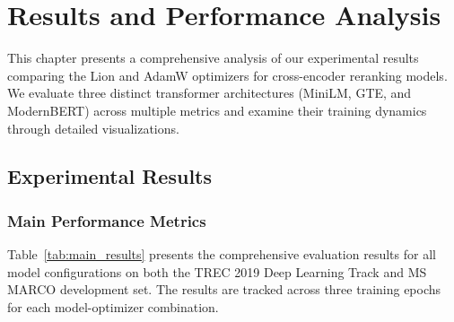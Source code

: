 \chapter{Results and Performance Analysis}
\label{Chapter5}

This chapter presents a comprehensive analysis of our experimental results comparing the Lion and AdamW optimizers for cross-encoder reranking models. We evaluate three distinct transformer architectures (MiniLM, GTE, and ModernBERT) across multiple metrics and examine their training dynamics through detailed visualizations.

\section{Experimental Results}

\subsection{Main Performance Metrics}

Table~\ref{tab:main_results} presents the comprehensive evaluation results for all model configurations on both the TREC 2019 Deep Learning Track and MS MARCO development set. The results are tracked across three training epochs for each model-optimizer combination.

